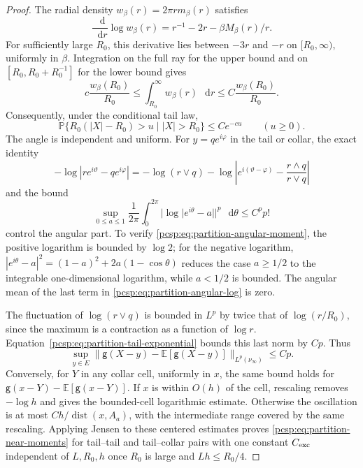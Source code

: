 \documentclass[11pt,reqno]{amsart}
\numberwithin{equation}{section}
\theoremstyle{plain}
\theoremstyle{definition}
\newcommand{\dd}{\mathop{}\!\mathrm d}
\newcommand{\E}{\mathbb E}
\newcommand{\Pb}{\mathbb P}
\newcommand{\be}{\beta}
\newcommand{\g}{\mathsf g}
\begin{document}
\begin{proof}
The radial density $w_\be(r)=2\pi r m_\be(r)$ satisfies
\begin{equation}\label{pcsp:eq:partition-tail-radial}
 \frac{\dd}{\dd r}\log w_\be(r)
 =r^{-1}-2r-\be M_\be(r)/r.
\end{equation}
For sufficiently large $R_0$, this derivative lies between $-3r$ and $-r$ on $[R_0,\infty)$, uniformly in $\be$. Integration on the full ray for the upper bound and on $[R_0,R_0+R_0^{-1}]$ for the lower bound gives
\begin{equation}\label{pcsp:eq:partition-tail-normalization}
 c\frac{w_\be(R_0)}{R_0}
 \leq\int_{R_0}^\infty w_\be(r)\,\dd r
 \leq C\frac{w_\be(R_0)}{R_0}.
\end{equation}
Consequently, under the conditional tail law,
\begin{equation}\label{pcsp:eq:partition-tail-exponential}
 \Pb\{R_0(|X|-R_0)>u\mid |X|>R_0\}\leq C e^{-cu}
 \qquad(u\geq0).
\end{equation}
The angle is independent and uniform. For $y=qe^{i\varphi}$ in the tail or collar, the exact identity
\begin{equation}\label{pcsp:eq:partition-angular-log}
 -\log|re^{i\vartheta}-qe^{i\varphi}|
 =-\log(r\vee q)
  -\log\left|e^{i(\vartheta-\varphi)}-\frac{r\wedge q}{r\vee q}\right|
\end{equation}
and the bound
\begin{equation}\label{pcsp:eq:partition-angular-moment}
 \sup_{0\leq a\leq1}\frac1{2\pi}\int_0^{2\pi}
       |\log|e^{i\theta}-a||^p\,\dd\theta\leq C^p p!
\end{equation}
control the angular part. To verify \eqref{pcsp:eq:partition-angular-moment}, the positive logarithm is bounded by $\log2$; for the negative logarithm, $|e^{i\theta}-a|^2=(1-a)^2+2a(1-\cos\theta)$ reduces the case $a\geq1/2$ to the integrable one-dimensional logarithm, while $a<1/2$ is bounded. The angular mean of the last term in \eqref{pcsp:eq:partition-angular-log} is zero.

The fluctuation of $\log(r\vee q)$ is bounded in $L^p$ by twice that of $\log(r/R_0)$, since the maximum is a contraction as a function of $\log r$. Equation~\eqref{pcsp:eq:partition-tail-exponential} bounds this last norm by $Cp$. Thus
\begin{equation}\label{pcsp:eq:partition-tail-centered-moment}
 \sup_{y\in E}\|\g(X-y)-\E[\g(X-y)]\|_{L^p(\nu_\infty)}\leq Cp.
\end{equation}
Conversely, for $Y$ in any collar cell, uniformly in $x$, the same bound holds for $\g(x-Y)-\E[\g(x-Y)]$. If $x$ is within $O(h)$ of the cell, rescaling removes $-\log h$ and gives the bounded-cell logarithmic estimate. Otherwise the oscillation is at most $Ch/\operatorname{dist}(x,A_a)$, with the intermediate range covered by the same rescaling. Applying Jensen to these centered estimates proves \eqref{pcsp:eq:partition-near-moments} for tail--tail and tail--collar pairs with one constant $C_{\rm exc}$ independent of $L,R_0,h$ once $R_0$ is large and $Lh\leq R_0/4$.


\end{proof}
\end{document}
